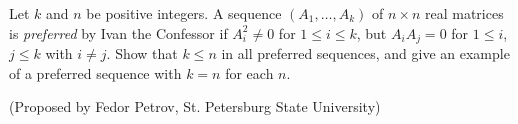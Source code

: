 Let $k$ and $n$ be positive integers. A sequence $\left( A_1, \dots , A_k \right)$ of $n\times n$ real matrices is \textit{preferred} by Ivan the Confessor if $A_i^2\neq 0$ for $1\le i\le k$, but $A_iA_j=0$ for $1\le i$, $j\le k$ with $i\neq j$. Show that $k\le n$ in all preferred sequences, and give an example of a preferred sequence with $k=n$ for each $n$.

(Proposed by Fedor Petrov, St. Petersburg State University)